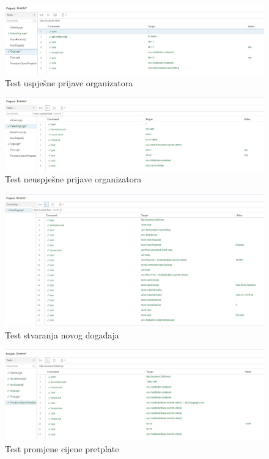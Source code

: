 			\begin{figure}[H]
				\includegraphics[scale=0.30]{testovi/uspjesnaOrg.jpg}
				\centering
				\caption{Test uspješne prijave organizatora}
				\label{fig:promjene}
			\end{figure}
			
				\begin{figure}[H]
				\includegraphics[scale=0.30]{testovi/neuspjesnaOrganizator.jpg}
				\centering
				\caption{Test neuspješne prijave organizatora}
				\label{fig:promjene}
			\end{figure}
			
			\begin{figure}[H]
				\includegraphics[scale=0.30]{testovi/noviDogadaj.jpg}
				\centering
				\caption{Test stvaranja novog događaja}
				\label{fig:promjene}
			\end{figure}
			
			\begin{figure}[H]
				\includegraphics[scale=0.30]{testovi/promjenacijenepretplate.jpg}
				\centering
				\caption{Test promjene cijene pretplate}
				\label{fig:promjene}
			\end{figure}
			
